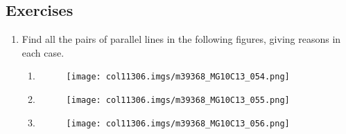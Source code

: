             \subsection{ Exercises}
            \nopagebreak
            \label{m39368*id320135}\begin{enumerate}[noitemsep, label=\textbf{\arabic*}. ] 
            \label{m39368*uid112}\item Find all the pairs of parallel lines in the following figures, giving reasons in each case.
\label{m39368*eip-78}\begin{enumerate}[noitemsep, label=\textbf{\alph*}. ] 
            \label{m39368*uid113}\item 
    \setcounter{subfigure}{0}
	\begin{figure}[H] %
    \begin{center}
    \label{m39368*id320164!!!underscore!!!media}\label{m39368*id320164!!!underscore!!!printimage}\texttt{[image: col11306.imgs/m39368\_MG10C13\_054.png]} %
      \vspace{2pt}
    \vspace{.1in}
    \end{center}
 \end{figure}       
        \label{m39368*uid114}\item 
    \setcounter{subfigure}{0}
	\begin{figure}[H] %
    \begin{center}
    \label{m39368*id320183!!!underscore!!!media}\label{m39368*id320183!!!underscore!!!printimage}\texttt{[image: col11306.imgs/m39368\_MG10C13\_055.png]} %
      \vspace{2pt}
    \vspace{.1in}
    \end{center}
 \end{figure}       
        \label{m39368*uid115}\item 
    \setcounter{subfigure}{0}
	\begin{figure}[H] %
    \begin{center}
    \label{m39368*id320201!!!underscore!!!media}\label{m39368*id320201!!!underscore!!!printimage}\texttt{[image: col11306.imgs/m39368\_MG10C13\_056.png]} %
      \vspace{2pt}
    \vspace{.1in}
    \end{center}

\end{figure}
\end{enumerate}
\end{enumerate}
